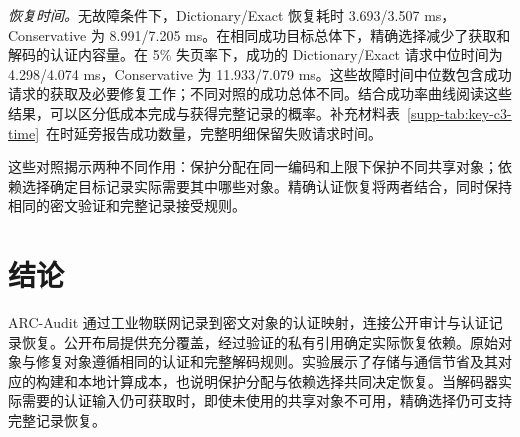\documentclass[10pt,journal]{IEEEtran}
\begin{document}
\emph{恢复时间。}无故障条件下，Dictionary/Exact 恢复耗时 3.693/3.507 ms，Conservative 为 8.991/7.205 ms。在相同成功目标总体下，精确选择减少了获取和解码的认证内容量。在 5\% 失页率下，成功的 Dictionary/Exact 请求中位时间为 4.298/4.074 ms，Conservative 为 11.933/7.079 ms。这些故障时间中位数包含成功请求的获取及必要修复工作；不同对照的成功总体不同。结合成功率曲线阅读这些结果，可以区分低成本完成与获得完整记录的概率。补充材料表~\ref*{supp-tab:key-c3-time}~在时延旁报告成功数量，完整明细保留失败请求时间。

这些对照揭示两种不同作用：保护分配在同一编码和上限下保护不同共享对象；依赖选择确定目标记录实际需要其中哪些对象。精确认证恢复将两者结合，同时保持相同的密文验证和完整记录接受规则。

\section{结论}
ARC-Audit 通过工业物联网记录到密文对象的认证映射，连接公开审计与认证记录恢复。公开布局提供充分覆盖，经过验证的私有引用确定实际恢复依赖。原始对象与修复对象遵循相同的认证和完整解码规则。实验展示了存储与通信节省及其对应的构建和本地计算成本，也说明保护分配与依赖选择共同决定恢复。当解码器实际需要的认证输入仍可获取时，即使未使用的共享对象不可用，精确选择仍可支持完整记录恢复。



\end{document}
